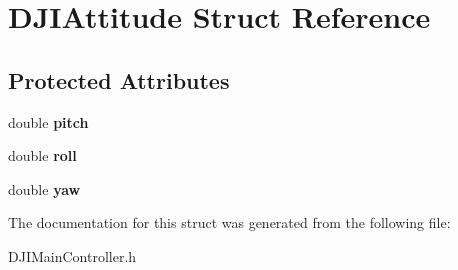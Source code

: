 \hypertarget{struct_d_j_i_attitude}{\section{D\+J\+I\+Attitude Struct Reference}
\label{struct_d_j_i_attitude}
}
\subsection*{Protected Attributes}
\begin{DoxyCompactItemize}
\item 
\hypertarget{struct_d_j_i_attitude_a06da02bd519fc651963b84e6adda34df}{double {\bfseries pitch}}\label{struct_d_j_i_attitude_a06da02bd519fc651963b84e6adda34df}

\item 
\hypertarget{struct_d_j_i_attitude_a5b24feb9c501776a0d129a151ffaa6f9}{double {\bfseries roll}}\label{struct_d_j_i_attitude_a5b24feb9c501776a0d129a151ffaa6f9}

\item 
\hypertarget{struct_d_j_i_attitude_aeb6af3357a98e570e19564d2e3787017}{double {\bfseries yaw}}\label{struct_d_j_i_attitude_aeb6af3357a98e570e19564d2e3787017}

\end{DoxyCompactItemize}


The documentation for this struct was generated from the following file\+:\begin{DoxyCompactItemize}
\item 
D\+J\+I\+Main\+Controller.\+h\end{DoxyCompactItemize}
